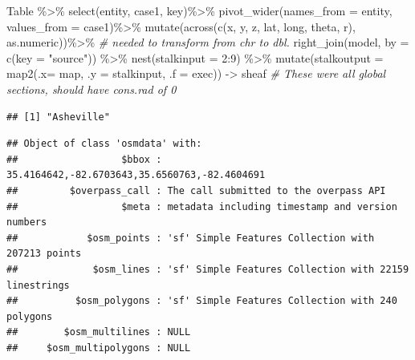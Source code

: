 \documentclass[
]{article}
\newenvironment{Shaded}{\begin{snugshade}}{\end{snugshade}}
\newcommand{\AttributeTok}[1]{\textcolor[rgb]{0.77,0.63,0.00}{#1}}
\newcommand{\CommentTok}[1]{\textcolor[rgb]{0.56,0.35,0.01}{\textit{#1}}}
\newcommand{\DecValTok}[1]{\textcolor[rgb]{0.00,0.00,0.81}{#1}}
\newcommand{\FunctionTok}[1]{\textcolor[rgb]{0.00,0.00,0.00}{#1}}
\newcommand{\NormalTok}[1]{#1}
\newcommand{\OtherTok}[1]{\textcolor[rgb]{0.56,0.35,0.01}{#1}}
\newcommand{\SpecialCharTok}[1]{\textcolor[rgb]{0.00,0.00,0.00}{#1}}
\newcommand{\StringTok}[1]{\textcolor[rgb]{0.31,0.60,0.02}{#1}}
\begin{document}
\begin{Shaded}
\begin{Highlighting}[]
\NormalTok{Table }\SpecialCharTok{\%\textgreater{}\%}
  \FunctionTok{select}\NormalTok{(entity, case1, key)}\SpecialCharTok{\%\textgreater{}\%}
  \FunctionTok{pivot\_wider}\NormalTok{(}\AttributeTok{names\_from =}\NormalTok{ entity, }\AttributeTok{values\_from =}\NormalTok{ case1)}\SpecialCharTok{\%\textgreater{}\%}
  \FunctionTok{mutate}\NormalTok{(}\FunctionTok{across}\NormalTok{(}\FunctionTok{c}\NormalTok{(x, y, z, lat, long, theta, r), as.numeric))}\SpecialCharTok{\%\textgreater{}\%} \CommentTok{\# needed to transform from chr to dbl. }
  \FunctionTok{right\_join}\NormalTok{(model, }\AttributeTok{by =} \FunctionTok{c}\NormalTok{(}\AttributeTok{key =} \StringTok{"source"}\NormalTok{)) }\SpecialCharTok{\%\textgreater{}\%}
  \FunctionTok{nest}\NormalTok{(}\AttributeTok{stalkinput =} \DecValTok{2}\SpecialCharTok{:}\DecValTok{9}\NormalTok{) }\SpecialCharTok{\%\textgreater{}\%}
  \FunctionTok{mutate}\NormalTok{(}\AttributeTok{stalkoutput =} \FunctionTok{map2}\NormalTok{(}\AttributeTok{.x=}\NormalTok{ map, }\AttributeTok{.y =}\NormalTok{ stalkinput, }\AttributeTok{.f =}\NormalTok{ exec)) }\OtherTok{{-}\textgreater{}}\NormalTok{ sheaf }\CommentTok{\# These were all global sections, should have cons.rad of 0}
\end{Highlighting}
\end{Shaded}

\begin{verbatim}
## [1] "Asheville"
\end{verbatim}

\begin{verbatim}
## Object of class 'osmdata' with:
##                  $bbox : 35.4164642,-82.6703643,35.6560763,-82.4604691
##         $overpass_call : The call submitted to the overpass API
##                  $meta : metadata including timestamp and version numbers
##            $osm_points : 'sf' Simple Features Collection with 207213 points
##             $osm_lines : 'sf' Simple Features Collection with 22159 linestrings
##          $osm_polygons : 'sf' Simple Features Collection with 240 polygons
##        $osm_multilines : NULL
##     $osm_multipolygons : NULL
\end{verbatim}
\end{document}
